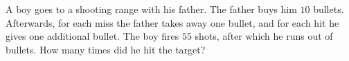 A boy goes to a shooting range with his father. The father buys him $10$ bullets. Afterwards, for each miss the father takes away one bullet, and for each hit he gives one additional bullet. The boy fires $55$ shots, after which he runs out of bullets. How many times did he hit the target?
